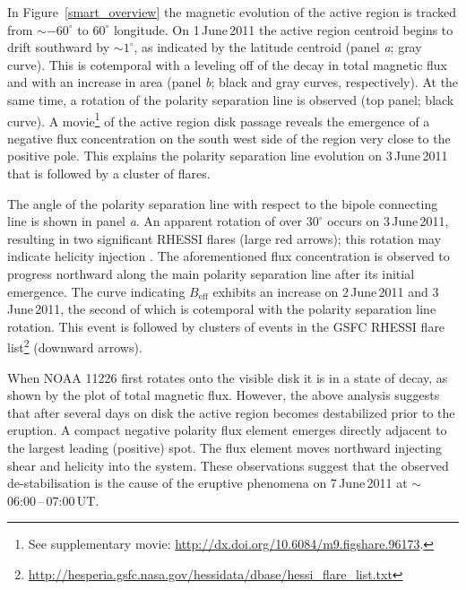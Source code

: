 {%
In Figure~\ref{smart_overview} the magnetic evolution of the active region is tracked from $\sim$$-60^\circ$ to $60^\circ$ longitude. On 1\,June\,2011 the active region centroid begins to drift southward by $\sim$$1^\circ$, as indicated by the latitude centroid (panel \emph{a}; gray curve). This is cotemporal with a leveling off of the decay in total magnetic flux and with an increase in area (panel \emph{b}; black and gray curves, respectively). At the same time, a rotation of the polarity separation line is observed (top panel; black curve). A movie\footnote{See supplementary movie: \url{http://dx.doi.org/10.6084/m9.figshare.96173}.} of the active region disk passage reveals the emergence of a negative flux concentration on the south west side of the region very close to the positive pole. This explains the polarity separation line evolution on 3\,June\,2011 that is followed by a cluster of flares.

The angle of the polarity separation line with respect to the bipole connecting line is shown in panel \emph{a}. An apparent rotation of over $30^\circ$ occurs on 3\,June\,2011, resulting in two significant \gls{RHESSI} flares (large red arrows); this rotation may indicate helicity injection \citep{Morita:2005}. The aforementioned flux concentration is observed to progress northward along the main polarity separation line after its initial emergence. The curve indicating $B_{\mathrm{eff}}$ exhibits an increase on 2\,June\,2011 and 3\,June\,2011, the second of which is cotemporal with the polarity separation line rotation. This event is followed by clusters of events in the \gls{GSFC} \gls{RHESSI} flare list\footnote{\url{http://hesperia.gsfc.nasa.gov/hessidata/dbase/hessi\_flare\_list.txt}} (downward arrows).


When NOAA 11226 first rotates onto the visible disk it is in a state of decay, as shown by the plot of total magnetic flux. However, the above analysis suggests that after several days on disk the active region becomes destabilized prior to the eruption. A compact negative polarity flux element emerges directly adjacent to the largest leading (positive) spot. The flux element moves northward injecting shear and helicity into the system. These observations suggest that the observed de-stabilisation is the cause of the eruptive phenomena on 7\,June\,2011 at $\sim$06:00\,--\,07:00\,UT.


}
